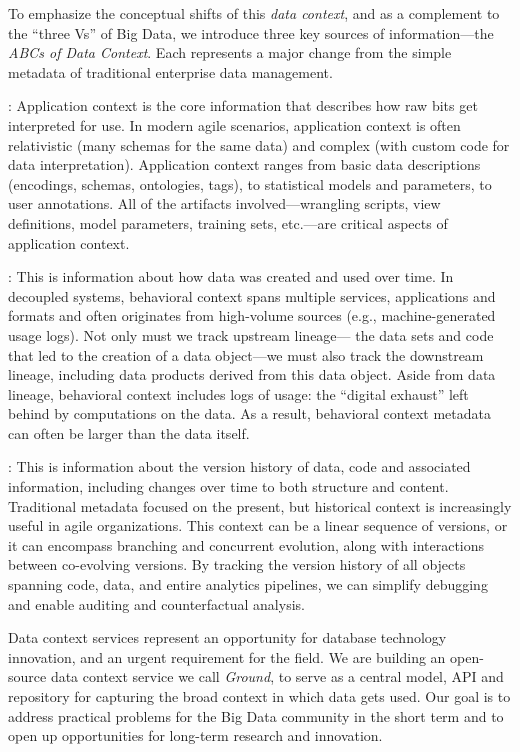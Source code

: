 \documentclass{cidr-2017}
\begin{document}
To emphasize the conceptual shifts of this \emph{data context}, and as a complement to the ``three Vs'' of Big Data,
we introduce three key sources of information---the \emph{ABCs of Data Context}. Each represents a major change from the simple metadata of traditional enterprise data management.

: Application context is the core information that describes how raw bits get interpreted for use. 
In modern agile scenarios, application context is often relativistic (many schemas for the same data) and complex (with custom code for data interpretation). 
Application context ranges from basic data descriptions (encodings, schemas, ontologies, tags), to statistical models and parameters, to user annotations.  
All of the artifacts involved---wrangling scripts, view definitions, model parameters, training sets, etc.---are critical aspects of application context. 

: This is information about how data was created and used over time. 
In decoupled systems, behavioral context spans multiple services, applications and formats and often originates from high-volume sources (e.g., machine-generated usage logs).
Not only must we track upstream lineage---
the data sets and code that led to the creation of a data object---we must also track the 
downstream lineage, including data products derived from this data object. 
Aside from data lineage, behavioral context includes logs of usage: the ``digital exhaust'' left behind by computations on the data. 
As a result, behavioral context metadata can 
often be larger than the data itself. 

:
This is information about the version history of data, code and associated information, including changes over time to both structure and content. 
Traditional metadata focused on the present, but historical context is increasingly useful in agile organizations.
This context can be a linear sequence of versions, or it can encompass branching and concurrent evolution, along with interactions 
between co-evolving versions.
By tracking the version history of all objects spanning code, data, and entire analytics pipelines, we can simplify debugging and enable auditing and counterfactual analysis. 

\smallitembot
Data context services represent an opportunity for database technology innovation, and an urgent requirement for the field.
We are building an open-source data context service we call \emph{Ground}, to serve as a central model, API and repository for capturing the broad context in which data gets used. 
Our goal is to address practical problems for the Big Data community in the short term and to open up opportunities for long-term research and innovation.
\end{document}
